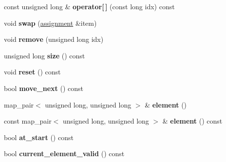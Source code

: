 \begin{DoxyCompactItemize}
\item 
\hypertarget{classdlib_1_1assignment_a18bf75e6c9ee1e9331ed060681ec364d}{
const unsigned long \& {\bfseries operator\mbox{[}$\,$\mbox{]}} (const long idx) const }
\label{classdlib_1_1assignment_a18bf75e6c9ee1e9331ed060681ec364d}

\item 
\hypertarget{classdlib_1_1assignment_ac4e11a39021bdaa13dba1fcfbee773a6}{
void {\bfseries swap} (\hyperlink{classdlib_1_1assignment}{assignment} \&item)}
\label{classdlib_1_1assignment_ac4e11a39021bdaa13dba1fcfbee773a6}

\item 
\hypertarget{classdlib_1_1assignment_a07d5568b7d6f4fdb0aa4ab286179b806}{
void {\bfseries remove} (unsigned long idx)}
\label{classdlib_1_1assignment_a07d5568b7d6f4fdb0aa4ab286179b806}

\item 
\hypertarget{classdlib_1_1assignment_adb14891314fee1f1723929fdec3efb01}{
unsigned long {\bfseries size} () const }
\label{classdlib_1_1assignment_adb14891314fee1f1723929fdec3efb01}

\item 
\hypertarget{classdlib_1_1assignment_aeecaf59a6ad760dd7bf640966fe1230b}{
void {\bfseries reset} () const }
\label{classdlib_1_1assignment_aeecaf59a6ad760dd7bf640966fe1230b}

\item 
\hypertarget{classdlib_1_1assignment_ab959307ab986673d4ab983e19a9c818c}{
bool {\bfseries move\_\-next} () const }
\label{classdlib_1_1assignment_ab959307ab986673d4ab983e19a9c818c}

\item 
\hypertarget{classdlib_1_1assignment_a2038496c149f5586140466b06cf49c5b}{
map\_\-pair$<$ unsigned long, unsigned long $>$ \& {\bfseries element} ()}
\label{classdlib_1_1assignment_a2038496c149f5586140466b06cf49c5b}

\item 
\hypertarget{classdlib_1_1assignment_a83af025bdb1c87104924c25a11c51ff7}{
const map\_\-pair$<$ unsigned long, unsigned long $>$ \& {\bfseries element} () const }
\label{classdlib_1_1assignment_a83af025bdb1c87104924c25a11c51ff7}

\item 
\hypertarget{classdlib_1_1assignment_afea92a3eadc591c0f94188d1a9b29454}{
bool {\bfseries at\_\-start} () const }
\label{classdlib_1_1assignment_afea92a3eadc591c0f94188d1a9b29454}

\item 
\hypertarget{classdlib_1_1assignment_a20d81215cd5da8b44268084fc2724fe9}{
bool {\bfseries current\_\-element\_\-valid} () const }
\label{classdlib_1_1assignment_a20d81215cd5da8b44268084fc2724fe9}

\end{DoxyCompactItemize}
